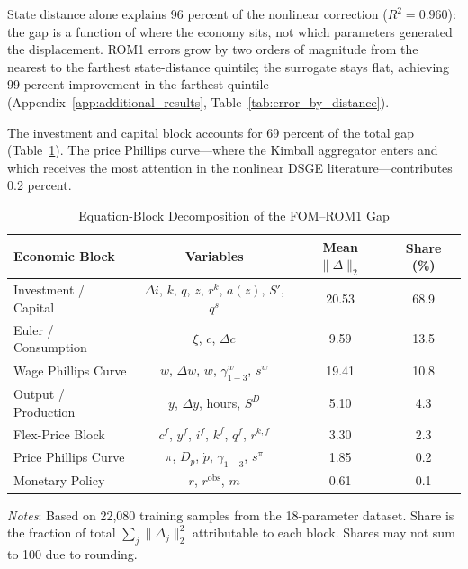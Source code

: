\documentclass[12pt]{article}
\theoremstyle{plain}
\theoremstyle{definition}
\theoremstyle{remark}
\begin{document}
State distance alone explains 96 percent of the nonlinear correction ($R^2 = 0.960$): the gap is a function of where the economy sits, not which parameters generated the displacement. ROM1 errors grow by two orders of magnitude from the nearest to the farthest state-distance quintile; the surrogate stays flat, achieving 99 percent improvement in the farthest quintile (Appendix~\ref{app:additional_results}, Table~\ref{tab:error_by_distance}).

The investment and capital block accounts for 69 percent of the total gap (Table~\ref{tab:equation_block}). The price Phillips curve---where the Kimball aggregator enters and which receives the most attention in the nonlinear DSGE literature---contributes 0.2 percent.

\begin{table}[htbp]
\centering
\caption{Equation-Block Decomposition of the FOM--ROM1 Gap}
\label{tab:equation_block}
\begin{tabular}{lccc}
\toprule
Economic Block & Variables & Mean $\|\Delta\|_2$ & Share (\%) \\
\midrule
Investment / Capital & $\Delta i$, $k$, $q$, $z$, $r^k$, $a(z)$, $S'$, $q^s$ & 20.53 & 68.9 \\
Euler / Consumption & $\xi$, $c$, $\Delta c$ & 9.59 & 13.5 \\
Wage Phillips Curve & $w$, $\Delta w$, $\dot{w}$, $\gamma^w_{1{-}3}$, $s^w$ & 19.41 & 10.8 \\
Output / Production & $y$, $\Delta y$, hours, $S^D$ & 5.10 & 4.3 \\
Flex-Price Block & $c^f$, $y^f$, $i^f$, $k^f$, $q^f$, $r^{k,f}$ & 3.30 & 2.3 \\
Price Phillips Curve & $\pi$, $D_p$, $\dot{p}$, $\gamma_{1{-}3}$, $s^\pi$ & 1.85 & 0.2 \\
Monetary Policy & $r$, $r^{\text{obs}}$, $m$ & 0.61 & 0.1 \\
\bottomrule
\end{tabular}

\smallskip
{\footnotesize \textit{Notes}: Based on 22,080 training samples from the 18-parameter dataset. Share is the fraction of total $\sum_j \|\Delta_j\|_2^2$ attributable to each block. Shares may not sum to 100 due to rounding.}
\end{table}
\end{document}
